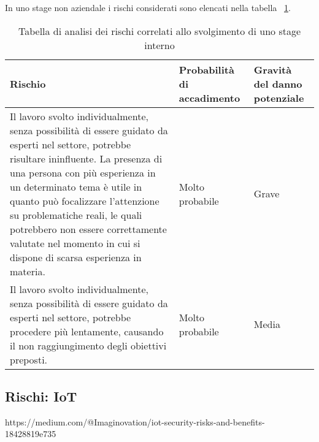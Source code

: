 In uno stage non aziendale i rischi considerati sono elencati nella tabella ~\ref{tab:rischi-stage-interno}.

\begin{table}
\caption{Tabella di analisi dei rischi correlati allo svolgimento di uno stage interno}
\label{tab:rischi-stage-interno}
\begin{tabularx}{\linewidth}{|p{7.5cm}|X|X|}
\hline
\textbf{Rischio} & \textbf{Probabilità di accadimento} & \textbf{Gravità del danno potenziale}\\
\hline
Il lavoro svolto individualmente, senza possibilità di essere guidato da esperti nel settore, potrebbe risultare ininfluente. La presenza di una persona con più esperienza in un determinato tema è utile in quanto può focalizzare l'attenzione su problematiche reali, le quali potrebbero non essere correttamente valutate nel momento in cui si dispone di scarsa esperienza in materia. & Molto probabile & Grave \\
\hline
Il lavoro svolto individualmente, senza possibilità di essere guidato da esperti nel settore, potrebbe procedere più lentamente, causando il non raggiungimento degli obiettivi preposti. & Molto probabile & Media \\
\hline
\end{tabularx}
\end{table}


\subsection{Rischi: IoT}

https://medium.com/@Imaginovation/iot-security-risks-and-benefits-18428819e735

